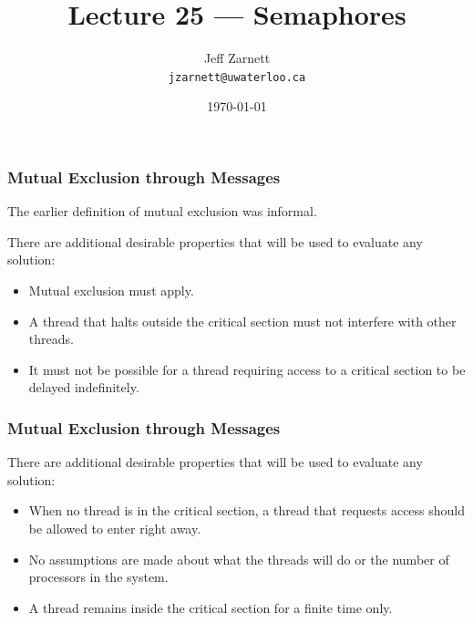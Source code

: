 

\title{Lecture 25 --- Semaphores }

\author{Jeff Zarnett \\ \small \texttt{jzarnett@uwaterloo.ca}}
\date{\today}




\begin{frame}
	\titlepage

\end{frame}

\begin{frame}
	\frametitle{Mutual Exclusion through Messages}

	The earlier definition of mutual exclusion was informal.

	There are additional desirable properties that will be used to evaluate any solution:
	\begin{itemize}
		\item Mutual exclusion must apply.
		\item A thread that halts outside the critical section must not interfere with other threads.
		\item It must not be possible for a thread requiring access to a critical section to be delayed indefinitely.
	\end{itemize}
\end{frame}

\begin{frame}
	\frametitle{Mutual Exclusion through Messages}
	There are additional desirable properties that will be used to evaluate any solution:
	\begin{itemize}
		\item When no thread is in the critical section, a thread that requests access should be allowed to enter right away.
		\item No assumptions are made about what the threads will do or the number of processors in the system.
		\item A thread remains inside the critical section for a finite time only.
	\end{itemize}


\end{frame}


